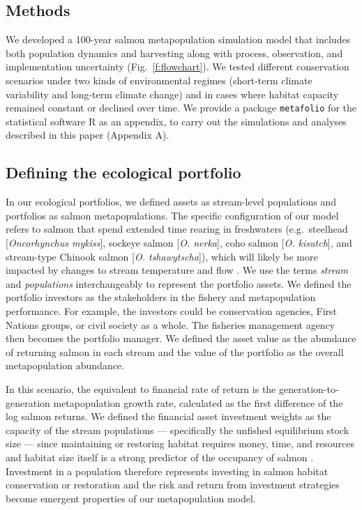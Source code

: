 \documentclass[12pt,english]{article}
\newcommand{\somR}{Appendix A}
\begin{document}
\begin{spacing}{1.9}
\section{Methods}\label{methods}

We developed a 100-year salmon metapopulation simulation model that includes both population dynamics and harvesting along with process, observation, and implementation uncertainty (Fig.~\ref{f:flowchart}). We tested different conservation scenarios under two kinds of environmental regimes (short-term climate variability and long-term climate change) and in cases where habitat capacity remained constant or declined over time. We provide a package \texttt{metafolio} \citep{metafoliopkg} for the statistical software \textsf{R} \citep{r2013} as an appendix, to carry out the simulations and analyses described in this paper (\somR).

\subsection{Defining the ecological portfolio}\label{defining-the-ecological-portfolio}

In our ecological portfolios, we defined assets as stream-level populations and portfolios as salmon metapopulations. The specific configuration of our model refers to salmon that spend extended time rearing in freshwaters (e.g.~steelhead {[}\emph{Oncorhynchus mykiss}{]}, sockeye salmon {[}\emph{O. nerka}{]}, coho salmon {[}\emph{O. kisutch}{]}, and stream-type Chinook salmon {[}\emph{O. tshawytscha}{]}), which will likely be more impacted by changes to stream temperature and flow \citep{mantua2010}. We use the terms \emph{stream} and \emph{populations} interchangeably to represent the portfolio assets. We defined the portfolio investors as the stakeholders in the fishery and metapopulation performance. For example, the investors could be conservation agencies, First Nations groups, or civil society as a whole. The fisheries management agency then becomes the portfolio manager. We defined the asset value as the abundance of returning salmon in each stream and the value of the portfolio as the overall metapopulation abundance.

In this scenario, the equivalent to financial rate of return is the generation-to-generation metapopulation growth rate, calculated as the first difference of the log salmon returns. We defined the financial asset investment weights as the capacity of the stream populations --- specifically the unfished equilibrium stock size --- since maintaining or restoring habitat requires money, time, and resources and habitat size itself is a strong predictor of the occupancy of salmon \citep{isaak2007}. Investment in a population therefore represents investing in salmon habitat conservation or restoration and the risk and return from investment strategies become emergent properties of our metapopulation model.


\end{spacing}
\end{document}
